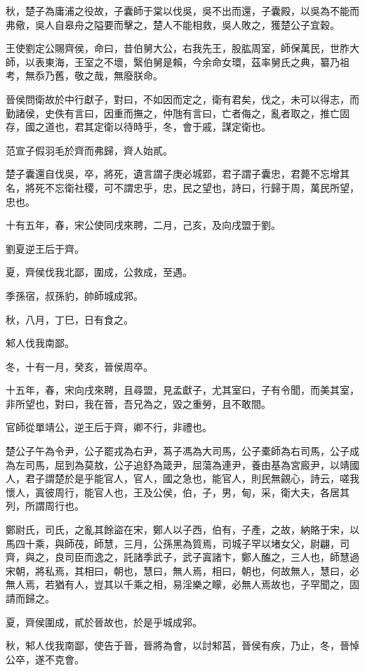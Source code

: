 \begin{pinyinscope}
秋，楚子為庸浦之役故，子囊師于棠以伐吳，吳不出而還，子囊殿，以吳為不能而弗儆，吳人自皋舟之隘要而擊之，楚人不能相救，吳人敗之，獲楚公子宜穀。

王使劉定公賜齊侯，命曰，昔伯舅大公，右我先王，股肱周室，師保萬民，世胙大師，以表東海，王室之不壞，繄伯舅是賴，今余命女環，茲率舅氏之典，纂乃祖考，無忝乃舊，敬之哉，無廢朕命。

晉侯問衛故於中行獻子，對曰，不如因而定之，衛有君矣，伐之，未可以得志，而勤諸侯，史佚有言曰，因重而撫之，仲虺有言曰，亡者侮之，亂者取之，推亡固存，國之道也，君其定衛以待時乎，冬，會于戚，謀定衛也。

范宣子假羽毛於齊而弗歸，齊人始貳。

楚子囊還自伐吳，卒，將死，遺言謂子庚必城郢，君子謂子囊忠，君薨不忘增其名，將死不忘衛社稷，可不謂忠乎，忠，民之望也，詩曰，行歸于周，萬民所望，忠也。

十有五年，春，宋公使同戌來聘，二月，己亥，及向戌盟于劉。

劉夏逆王后于齊。

夏，齊侯伐我北鄙，圍成，公救成，至遇。

季孫宿，叔孫豹，帥師城成郛。

秋，八月，丁巳，日有食之。

邾人伐我南鄙。

冬，十有一月，癸亥，晉侯周卒。

十五年，春，宋向戌來聘，且尋盟，見孟獻子，尤其室曰，子有令聞，而美其室，非所望也，對曰，我在晉，吾兄為之，毀之重勞，且不敢間。

官師從單靖公，逆王后于齊，卿不行，非禮也。

楚公子午為令尹，公子罷戎為右尹，蒍子馮為大司馬，公子橐師為右司馬，公子成為左司馬，屈到為莫敖，公子追舒為箴尹，屈蕩為連尹，養由基為宮廄尹，以靖國人，君子謂楚於是乎能官人，官人，國之急也，能官人，則民無覦心，詩云，嗟我懷人，寘彼周行，能官人也，王及公侯，伯，子，男，甸，采，衛大夫，各居其列，所謂周行也。

鄭尉氏，司氏，之亂其餘盜在宋，鄭人以子西，伯有，子產，之故，納賂于宋，以馬四十乘，與師茷，師慧，三月，公孫黑為質焉，司城子罕以堵女父，尉翩，司齊，與之，良司臣而逸之，託諸季武子，武子寘諸卞，鄭人醢之，三人也，師慧過宋朝，將私焉，其相曰，朝也，慧曰，無人焉，相曰，朝也，何故無人，慧曰，必無人焉，若猶有人，豈其以千乘之相，易淫樂之矇，必無人焉故也，子罕聞之，固請而歸之。

夏，齊侯圍成，貳於晉故也，於是乎城成郛。

秋，邾人伐我南鄙，使告于晉，晉將為會，以討邾莒，晉侯有疾，乃止，冬，晉悼公卒，遂不克會。


\end{pinyinscope}
